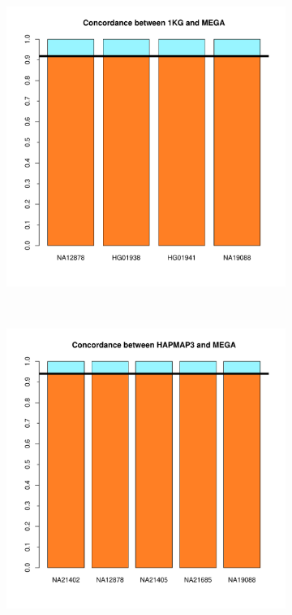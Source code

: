 \documentclass[11pt]{report}
\begin{document}
\newpage
\begin{figure}[ht!]
    \centering
    \caption{Comparacion cluster PAGE}
    \begin{subfigure}[t]{0.5\textwidth}
        \centering
        \includegraphics[scale=0.55]{Concordance_1KG_MEGA_clusterPAGE.pdf}
    \end{subfigure}%
    ~ 
    \begin{subfigure}[t]{0.5\textwidth}
        \centering
        \includegraphics[scale=0.55]{Concordance_HAPMAP_MEGA_clusterPAGE.pdf}
    \end{subfigure}
\end{figure}
\end{document}
